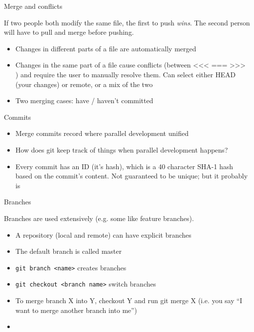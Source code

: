 \documentclass{beamer}
\begin{document}
\begin{frame}{Merge and conflicts}

If two people both modify the same file, the first to push \emph{wins}.
The second person will have to pull and merge before pushing.

\begin{itemize}
 \item Changes in different parts of a file are automatically merged
 \item Changes in the same part of a file cause conflicts (between <<<
=== >>> ) and require the user to manually resolve them. Can
select either HEAD (your changes) or remote, or a mix of the two
\item Two merging cases: have / haven't committed
\end{itemize}

\end{frame}

\begin{frame}{Commits}	

\begin{itemize}
 \item Merge commits record where parallel development unified
 \item How does git keep track of things when parallel development
happens?
\item Every commit has an ID (it's hash), which is a 40 character SHA-1
hash based on the commit's content. Not guaranteed to be
unique; but it probably is
\end{itemize}

\end{frame}

\begin{frame}{Branches}

Branches are used extensively (e.g. some like feature branches).

\begin{itemize}
 \item A repository (local and remote) can have explicit branches
 \item The default branch is called master
 \item \texttt{git branch <name>} creates branches
 \item \texttt{git checkout <branch name>} switch branches
 \item To merge branch X into Y, checkout Y and run git merge X
(i.e. you say “I want to merge another branch into me”)
 \item 
\end{itemize}


\end{frame}
\end{document}
